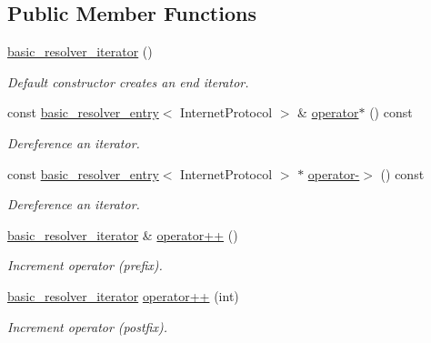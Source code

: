 \subsection*{Public Member Functions}
\begin{DoxyCompactItemize}
\item 
\hyperlink{classasio_1_1ip_1_1basic__resolver__iterator_a78a4783f973017eaa37d9c8072b732a8}{basic\+\_\+resolver\+\_\+iterator} ()
\begin{DoxyCompactList}\small\item\em Default constructor creates an end iterator. \end{DoxyCompactList}\item 
const \hyperlink{classasio_1_1ip_1_1basic__resolver__entry}{basic\+\_\+resolver\+\_\+entry}$<$ Internet\+Protocol $>$ \& \hyperlink{classasio_1_1ip_1_1basic__resolver__iterator_a5066e44d7e003dd08cc7b6c7caa8fb4f}{operator$\ast$} () const 
\begin{DoxyCompactList}\small\item\em Dereference an iterator. \end{DoxyCompactList}\item 
const \hyperlink{classasio_1_1ip_1_1basic__resolver__entry}{basic\+\_\+resolver\+\_\+entry}$<$ Internet\+Protocol $>$ $\ast$ \hyperlink{classasio_1_1ip_1_1basic__resolver__iterator_a378f8ec7cc93a80e69d83cd202d76935}{operator-\/$>$} () const 
\begin{DoxyCompactList}\small\item\em Dereference an iterator. \end{DoxyCompactList}\item 
\hyperlink{classasio_1_1ip_1_1basic__resolver__iterator}{basic\+\_\+resolver\+\_\+iterator} \& \hyperlink{classasio_1_1ip_1_1basic__resolver__iterator_aa3cd452bb2410028cd6c1bc88fe08713}{operator++} ()
\begin{DoxyCompactList}\small\item\em Increment operator (prefix). \end{DoxyCompactList}\item 
\hyperlink{classasio_1_1ip_1_1basic__resolver__iterator}{basic\+\_\+resolver\+\_\+iterator} \hyperlink{classasio_1_1ip_1_1basic__resolver__iterator_a9b12a6003e9f5d29f618a6754c218e36}{operator++} (int)
\begin{DoxyCompactList}\small\item\em Increment operator (postfix). \end{DoxyCompactList}\end{DoxyCompactItemize}
